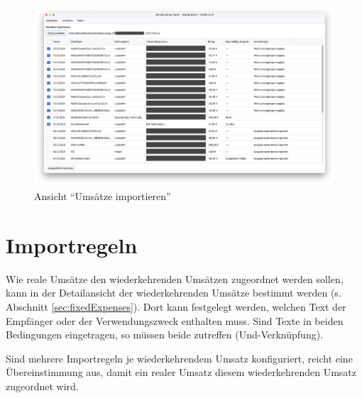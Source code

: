 \begin{figure}[ht!]
	\centering
	\includegraphics[width=\textwidth]{img/Screenshot-ImportView}
	\vspace{-2em}
	\caption{Ansicht "`Umsätze importieren"'}
	\label{fig:ImportView}
\end{figure}

\section{Importregeln}

Wie reale Umsätze den wiederkehrenden Umsätzen zugeordnet werden sollen, kann in der Detailansicht der wiederkehrenden Umsätze bestimmt werden (s. Abschnitt \ref{sec:fixedExpenses}). Dort kann festgelegt werden, welchen Text der Empfänger oder der Verwendungszweck enthalten muss. Sind Texte in beiden Bedingungen eingetragen, so müssen beide zutreffen (Und-Verknüpfung). 

Sind mehrere Importregeln je wiederkehrendem Umsatz konfiguriert, reicht eine Übereinstimmung aus, damit ein realer Umsatz diesem wiederkehrenden Umsatz zugeordnet wird. 